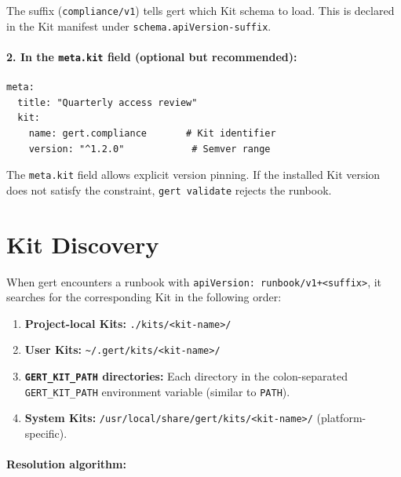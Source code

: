 The suffix (\texttt{compliance/v1}) tells gert which Kit schema to load. This
is declared in the Kit manifest under \texttt{schema.apiVersion-suffix}.

\paragraph{2. In the \texttt{meta.kit} field (optional but recommended):}

\begin{verbatim}
meta:
  title: "Quarterly access review"
  kit:
    name: gert.compliance       # Kit identifier
    version: "^1.2.0"            # Semver range
\end{verbatim}

The \texttt{meta.kit} field allows explicit version pinning. If the installed
Kit version does not satisfy the constraint, \texttt{gert validate} rejects the
runbook.

\section{Kit Discovery}
\label{sec:kit-discovery}

When gert encounters a runbook with \texttt{apiVersion: runbook/v1+<suffix>},
it searches for the corresponding Kit in the following order:

\begin{enumerate}
  \item \textbf{Project-local Kits:} \texttt{./kits/<kit-name>/}
  \item \textbf{User Kits:} \texttt{\textasciitilde/.gert/kits/<kit-name>/}
  \item \textbf{\texttt{GERT\_KIT\_PATH} directories:} Each directory in the
    colon-separated \texttt{GERT\_KIT\_PATH} environment variable (similar to
    \texttt{PATH}).
  \item \textbf{System Kits:} \texttt{/usr/local/share/gert/kits/<kit-name>/}
    (platform-specific).
\end{enumerate}

\paragraph{Resolution algorithm:}

